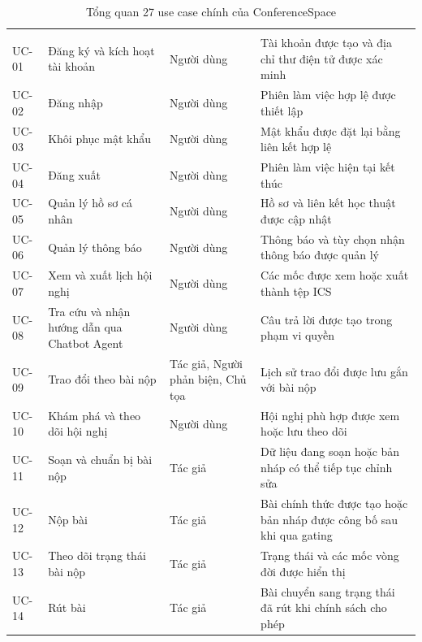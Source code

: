 \begin{longtable}{|N{0.10\textwidth}|T{0.28\textwidth}|T{0.19\textwidth}|T{0.42\textwidth}|}
\caption{Tổng quan 27 use case chính của ConferenceSpace}\label{tab:ch3-demo-usecase-overview}\\
\hline
{} &  &  &  \\ \hline
\endfirsthead
\hline
{} &  &  &  \\ \hline
\endhead
UC-01 & Đăng ký và kích hoạt tài khoản & Người dùng & Tài khoản được tạo và địa chỉ thư điện tử được xác minh \\ \hline
UC-02 & Đăng nhập & Người dùng & Phiên làm việc hợp lệ được thiết lập \\ \hline
UC-03 & Khôi phục mật khẩu & Người dùng & Mật khẩu được đặt lại bằng liên kết hợp lệ \\ \hline
UC-04 & Đăng xuất & Người dùng & Phiên làm việc hiện tại kết thúc \\ \hline
UC-05 & Quản lý hồ sơ cá nhân & Người dùng & Hồ sơ và liên kết học thuật được cập nhật \\ \hline
UC-06 & Quản lý thông báo & Người dùng & Thông báo và tùy chọn nhận thông báo được quản lý \\ \hline
UC-07 & Xem và xuất lịch hội nghị & Người dùng & Các mốc được xem hoặc xuất thành tệp ICS \\ \hline
UC-08 & Tra cứu và nhận hướng dẫn qua Chatbot Agent & Người dùng & Câu trả lời được tạo trong phạm vi quyền \\ \hline
UC-09 & Trao đổi theo bài nộp & Tác giả, Người phản biện, Chủ tọa & Lịch sử trao đổi được lưu gắn với bài nộp \\ \hline
UC-10 & Khám phá và theo dõi hội nghị & Người dùng & Hội nghị phù hợp được xem hoặc lưu theo dõi \\ \hline
UC-11 & Soạn và chuẩn bị bài nộp & Tác giả & Dữ liệu đang soạn hoặc bản nháp có thể tiếp tục chỉnh sửa \\ \hline
UC-12 & Nộp bài & Tác giả & Bài chính thức được tạo hoặc bản nháp được công bố sau khi qua gating \\ \hline
UC-13 & Theo dõi trạng thái bài nộp & Tác giả & Trạng thái và các mốc vòng đời được hiển thị \\ \hline
UC-14 & Rút bài & Tác giả & Bài chuyển sang trạng thái đã rút khi chính sách cho phép \\ \hline

\end{longtable}
